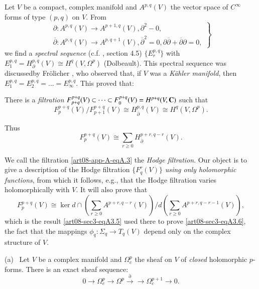 Let $V$ be a compact, complex manifold and $A^{p,q}(V)$ the vector space of $C^{\infty}$ forms of type $(p,q)$ on $V$. From
\setcounter{equation}{0}
\begin{equation}
\left.
\begin{array}{l}
\partial : A^{p,q}(V)\to A^{p+1,q}(V), \partial^{2}-0,\\
\overline{\partial} : A^{p,q}(V)\to A^{p,q+1}(V), \overline{\partial}^{2}=0, \partial\overline{\partial}+\overline{\partial}\partial=0,
\end{array}\right\}\label{art08-app-A-eqA.1}
\end{equation}
we find a {\em spectral sequence} (c.f. \cite{art08-key7}, section 4.5) $\{E^{p,q}_{r}\}$ with $E^{p,q}_{1}=H^{p,q}_{\partial}(V)\cong H^{q}(V,\Omega^{p})$ (Dolbeault). This spectral sequence was discussed\pageoriginale by Fr\"olicher \cite{art08-key6}, who observed that, if $V$ was a {\em K\"ahler manifold}, then $E^{p,q}_{1}=E^{p,q}_{2}=\ldots=E^{p,q}_{\infty}$. This proved that:

There is a {\em filtration} $F^{p+q}_{p+q}(V)\subset\cdots\subset F^{p+q}_{0}(V)=H^{p+q}(V,\mathbf{C})$ such that 
\begin{equation}
F^{p+q}_{p}(V)/F^{p+q}_{p+1}(V)\cong H^{p,q}_{\overline{\partial}}(V)\cong H^{q}(V,\Omega^{p}).\label{art08-app-A-eqA.2}
\end{equation}

Thus
\begin{equation}
F^{p+q}_{p}(V)\cong \sum\limits_{r\geq 0}H^{p+r,q-r}_{\overline{\partial}}(V).\label{art08-app-A-eqA.3}
\end{equation}

We call the filtration \eqref{art08-app-A-eqA.3} the {\em Hodge filtration}. Our object is to give a description of the Hodge filtration $\{F^{r}_{q}(V)\}$ {\em using only holomorphic functions}, from which it follows, e.g., that the Hodge filtration varies holomorphically with $V$. It will also prove that 
\begin{equation}
F^{p+q}_{p}(V)\cong \ker d\cap \left(\sum\limits_{r\geq 0}A^{p+r,q-r}(V)\right)/ d\left(\sum\limits_{r\geq 0}A^{p+r,q-r-1}(V)\right),\label{art08-app-A-eqA.4}
\end{equation}
which is the result \eqref{art08-sec3-eqA3.5} used there to prove \eqref{art08-sec3-eqA3.6}, the fact that the mappings $\phi_{q}:\Sigma_{q}\to T_{q}(V)$ depend only on the complex structure of $V$.

(a)~ Let $V$ be a complex manifold and $\Omega^{p}_{c}$ the sheaf on $V$ of {\em closed} holomorphic $p$-forms. There is an exact sheaf sequence:
\begin{equation}
0\to \Omega^{p}_{c}\to \Omega^{p}\xrightarrow{\partial}\to \Omega^{p+1}_{c}\to 0.\label{art08-app-A-eqA.5}
\end{equation}

